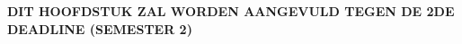 \chapter{}%
\label{ch:poc2}

\textbf{DIT HOOFDSTUK ZAL WORDEN AANGEVULD TEGEN DE 2DE DEADLINE (SEMESTER 2)}